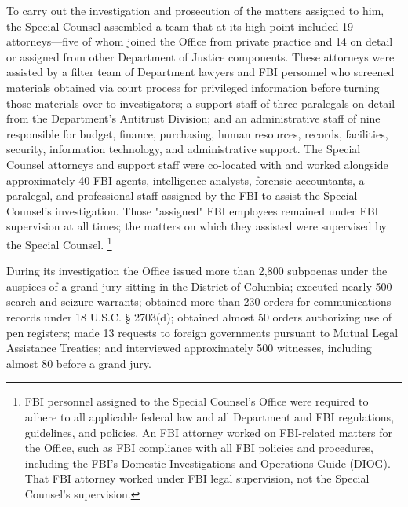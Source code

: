 To carry out the investigation and prosecution of the matters assigned to him, the Special Counsel assembled a team that at its high point included 19 attorneys---five of whom joined the Office from private practice and 14 on detail or assigned from other Department of Justice components.
These attorneys were assisted by a filter team of Department lawyers and FBI personnel who screened materials obtained via court process for privileged information before turning those materials over to investigators; a support staff of three paralegals on detail from the Department's Antitrust Division; and an administrative staff of nine responsible for budget, finance, purchasing, human resources, records, facilities, security, information technology, and administrative support.
The Special Counsel attorneys and support staff were co-located with and worked alongside approximately 40 FBI agents, intelligence analysts, forensic accountants, a paralegal, and professional staff assigned by the FBI to assist the Special Counsel's investigation.
Those "assigned" FBI employees remained under FBI supervision at all times; the matters on which they assisted were supervised by the Special Counsel.%
\footnote{FBI personnel assigned to the Special Counsel's Office were required to adhere to all applicable federal law and all Department and FBI regulations, guidelines, and policies.
An FBI attorney worked on FBI-related matters for the Office, such as FBI compliance with all FBI policies and procedures, including the FBI's Domestic Investigations and Operations Guide (DIOG).
That FBI attorney worked under FBI legal supervision, not the Special Counsel's supervision.}

During its investigation the Office issued more than 2,800 subpoenas under the auspices of a grand jury sitting in the District of Columbia; executed nearly 500 search-and-seizure warrants; obtained more than 230 orders for communications records under 18 U.S.C. § 2703(d); obtained almost 50 orders authorizing use of pen registers; made 13 requests to foreign governments pursuant to Mutual Legal Assistance Treaties; and interviewed approximately 500 witnesses, including almost 80 before a grand jury.

\hr

